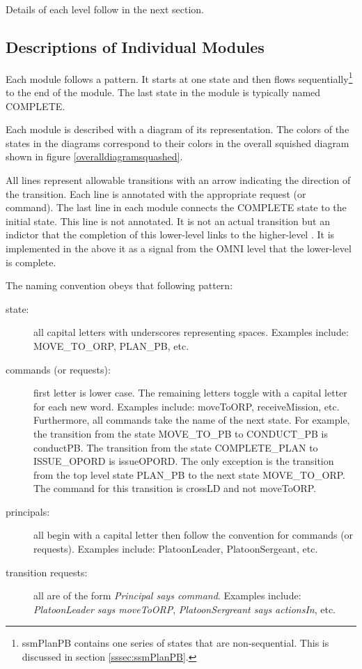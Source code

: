 \documentclass[../../main/main.tex]{subfiles}
\begin{document}
Details of each level follow in the next section.

\subsection{Descriptions of Individual Modules}
Each module follows a pattern.  It starts at one state and then flows sequentially\footnote{ssmPlanPB contains one series of states that are non-sequential.  This is discussed in section \ref{sssec:ssmPlanPB}.} to the end of the module.  The last state in the module is typically named COMPLETE. 

Each module is described with a diagram of its  representation.  The colors of the states in the diagrams correspond to their colors in the overall squished diagram shown in figure \ref{overalldiagramsquashed}.  

All lines represent allowable transitions with an arrow indicating the direction of the transition.  Each line is annotated with the appropriate  request (or command).  The last line in each module connects the COMPLETE state to the initial state.  This line is not annotated.  It is not an actual transition but an indictor that the completion of this lower-level  links to the higher-level .  It is implemented in the  above it as a signal from the OMNI level that the lower-level  is complete.

The naming convention obeys that following pattern:
\begin{description}
\item[state: ] all capital letters with underscores representing spaces.  Examples include: MOVE_TO_ORP, PLAN_PB, etc.
\item[commands (or requests):] first letter is lower case.  The remaining letters toggle with a capital letter for each new word.  Examples include: moveToORP,  receiveMission, etc.  Furthermore, all commands take the name of the next state. For example, the transition from the state MOVE_TO_PB to CONDUCT_PB is conductPB.  The transition from the state COMPLETE_PLAN to ISSUE_OPORD is issueOPORD.  The only exception is the transition from the top level state PLAN_PB to the next state MOVE_TO_ORP.  The command for this transition is crossLD and not moveToORP.
\item[principals:] all begin with a capital letter then follow the convention for commands (or requests).  Examples include: PlatoonLeader, PlatoonSergeant, etc.
\item [ transition requests:] all are of the form \textit{Principal says command}.  Examples include: \textit{PlatoonLeader says moveToORP}, \textit{PlatoonSergreant says actionsIn}, etc.
\end{description}
\end{document}
